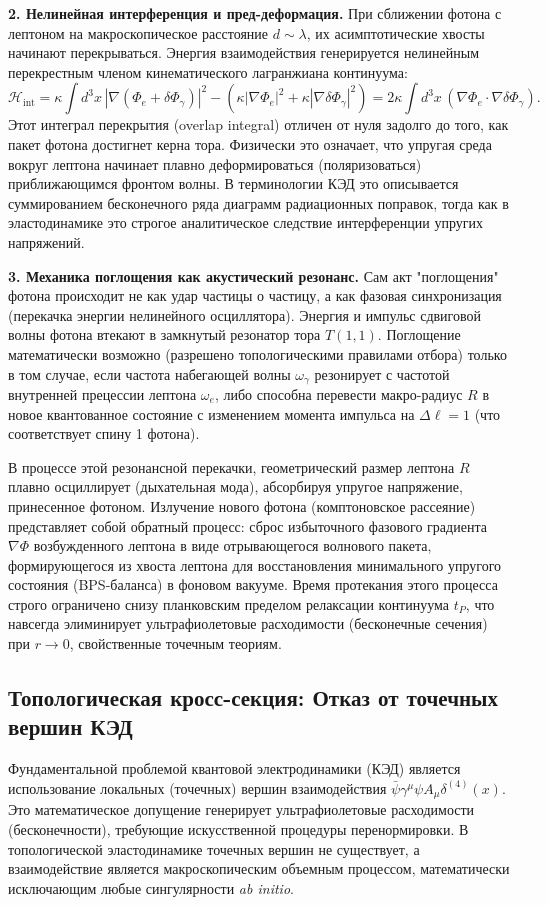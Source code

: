 \documentclass[11pt,a4paper]{article}
\begin{document}
\textbf{2. Нелинейная интерференция и пред-деформация.}
При сближении фотона с лептоном на макроскопическое расстояние $d \sim \lambda$, их асимптотические хвосты начинают перекрываться. Энергия взаимодействия генерируется нелинейным перекрестным членом кинематического лагранжиана континуума:
\begin{equation}
	\mathcal{H}_{\text{int}} = \kappa \int d^3x \, \left| \nabla (\Phi_e + \delta \Phi_\gamma) \right|^2 - \left( \kappa |\nabla \Phi_e|^2 + \kappa |\nabla \delta \Phi_\gamma|^2 \right) = 2\kappa \int d^3x \, (\nabla \Phi_e \cdot \nabla \delta \Phi_\gamma).
\end{equation}
Этот интеграл перекрытия (overlap integral) отличен от нуля задолго до того, как пакет фотона достигнет керна тора. Физически это означает, что упругая среда вокруг лептона начинает плавно деформироваться (поляризоваться) приближающимся фронтом волны. В терминологии КЭД это описывается суммированием бесконечного ряда диаграмм радиационных поправок, тогда как в эластодинамике это строгое аналитическое следствие интерференции упругих напряжений.

\textbf{3. Механика поглощения как акустический резонанс.}
Сам акт "поглощения" фотона происходит не как удар частицы о частицу, а как фазовая синхронизация (перекачка энергии нелинейного осциллятора). Энергия и импульс сдвиговой волны фотона втекают в замкнутый резонатор тора $T(1,1)$. 
Поглощение математически возможно (разрешено топологическими правилами отбора) только в том случае, если частота набегающей волны $\omega_\gamma$ резонирует с частотой внутренней прецессии лептона $\omega_e$, либо способна перевести макро-радиус $R$ в новое квантованное состояние с изменением момента импульса на $\Delta \ell = 1$ (что соответствует спину 1 фотона). 

В процессе этой резонансной перекачки, геометрический размер лептона $R$ плавно осциллирует (дыхательная мода), абсорбируя упругое напряжение, принесенное фотоном. Излучение нового фотона (комптоновское рассеяние) представляет собой обратный процесс: сброс избыточного фазового градиента $\nabla \Phi$ возбужденного лептона в виде отрывающегося волнового пакета, формирующегося из хвоста лептона для восстановления минимального упругого состояния (BPS-баланса) в фоновом вакууме. Время протекания этого процесса строго ограничено снизу планковским пределом релаксации континуума $t_P$, что навсегда элиминирует ультрафиолетовые расходимости (бесконечные сечения) при $r \to 0$, свойственные точечным теориям.

\subsection{Топологическая кросс-секция: Отказ от точечных вершин КЭД}
Фундаментальной проблемой квантовой электродинамики (КЭД) является использование локальных (точечных) вершин взаимодействия $\bar{\psi}\gamma^\mu\psi A_\mu \delta^{(4)}(x)$. Это математическое допущение генерирует ультрафиолетовые расходимости (бесконечности), требующие искусственной процедуры перенормировки. В топологической эластодинамике точечных вершин не существует, а взаимодействие является макроскопическим объемным процессом, математически исключающим любые сингулярности \textit{ab initio}.
\end{document}
